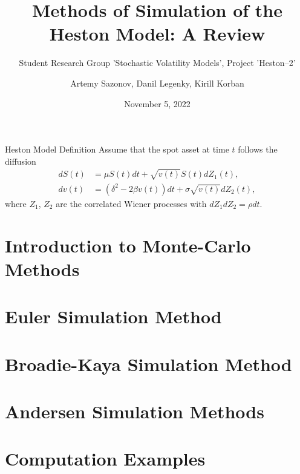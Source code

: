 \documentclass[aspectratio=169]{beamer}
\subtitle{Student Research Group 'Stochastic Volatility Models', Project 'Heston--2'}
\title{Methods of Simulation of the Heston Model: A Review}
\author{Artemy Sazonov, Danil Legenky, Kirill Korban}
\institute{Lomonosov Moscow State Univesity, Faculty of Mechanics and Mathematics}
\date{November 5, 2022}
\begin{document}
    \maketitle

    \begin{frame}{Heston Model Definition}
        Assume that the spot asset at time $t$ follows the diffusion
        \begin{align}
            dS(t) & = \mu S(t)dt + \sqrt{v(t)} S(t) dZ_1(t), \label{Heston:price}\\
            dv(t) & = \left(\delta^2 - 2\beta v(t)\right) dt + \sigma\sqrt{v(t)} dZ_2(t), \label{Heston:variance}
        \end{align}
        where $Z_1$, $Z_2$ are the correlated Wiener processes with $dZ_1dZ_2 = \rho dt$.
    \end{frame}

    \section{Introduction to Monte-Carlo Methods}
        

    \section{Euler Simulation Method}
        

    \section{Broadie-Kaya Simulation Method} 
        

    \section{Andersen Simulation Methods}
        

    \section{Computation Examples}
        

    
\end{document}
